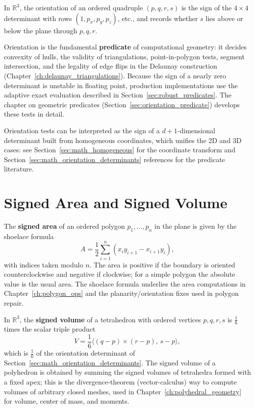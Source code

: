 In $\mathbb{R}^3$, the orientation of an ordered quadruple $(p,q,r,s)$ is
the sign of the $4\times 4$ determinant with rows $(1, p_x, p_y, p_z)$, etc.,
and records whether $s$ lies above or below the plane through $p,q,r$.

Orientation is the fundamental \textbf{predicate} of computational
geometry: it decides convexity of hulls, the validity of triangulations,
point-in-polygon tests, segment intersection, and the legality of edge flips
in the Delaunay construction (Chapter~\ref{ch:delaunay_triangulations}).
Because the sign of a nearly zero determinant is unstable in floating point,
production implementations use the adaptive exact evaluation described in
Section~\ref{sec:robust_predicates}. The chapter on geometric predicates
(Section~\ref{sec:orientation_predicate}) develops these tests in detail.

\begin{remark}
  Orientation tests can be interpreted as the sign of a
  $d+1$-dimensional determinant built from homogeneous coordinates, which
  unifies the 2D and 3D cases: see Section~\ref{sec:math_homogeneous} for the
  coordinate transform and Section~\ref{sec:math_orientation_determinants}
  references for the predicate literature.
\end{remark}


\section{Signed Area and Signed Volume}
\label{sec:math_signed_area_volume}

The \textbf{signed area} of an ordered polygon $p_1,\dots,p_n$ in the plane
is given by the shoelace formula
\[
  A = \frac{1}{2}\sum_{i=1}^n (x_i y_{i+1} - x_{i+1} y_i),
\]
with indices taken modulo $n$. The area is positive if the boundary is
oriented counterclockwise and negative if clockwise; for a simple polygon
the absolute value is the usual area. The shoelace formula underlies the
area computations in Chapter~\ref{ch:polygon_ops} and the
planarity/orientation fixes used in polygon repair.

In $\mathbb{R}^3$, the \textbf{signed volume} of a tetrahedron with ordered
vertices $p,q,r,s$ is $\frac{1}{6}$ times the scalar triple product
\[
  V = \frac{1}{6} \bigl\langle (q-p) \times (r-p),\, s-p \bigr\rangle,
\]
which is $\frac{1}{6}$ of the orientation determinant of
Section~\ref{sec:math_orientation_determinants}. The signed volume of a
polyhedron is obtained by summing the signed volumes of tetrahedra formed
with a fixed apex; this is the divergence-theorem (vector-calculus) way to
compute volumes of arbitrary closed meshes, used in Chapter~\ref{ch:polyhedral_geometry}
for volume, center of mass, and moments.

